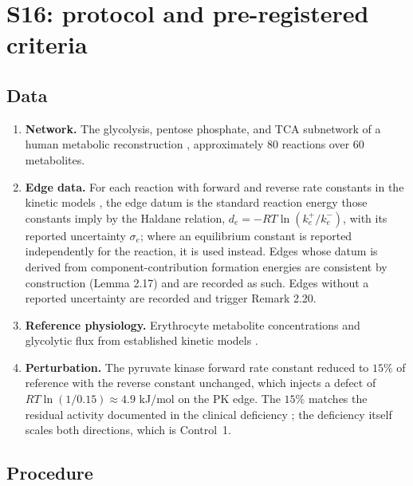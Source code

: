 \documentclass[11pt,a4paper]{article}
\theoremstyle{definition}
\theoremstyle{remark}
\begin{document}
\section*{S16: protocol and pre-registered criteria}

\subsection*{Data}

\begin{enumerate}[leftmargin=1.5em,itemsep=2pt]
\item \textbf{Network.} The glycolysis, pentose phosphate, and TCA
subnetwork of a human metabolic reconstruction
\citep{brunk2018}, approximately $80$ reactions over $60$ metabolites.
\item \textbf{Edge data.} For each reaction with forward and reverse rate
constants in the kinetic models \citep{rapoport1975,mulquiney1999}, the
edge datum is the standard reaction energy those constants imply by the
Haldane relation, $d_e=-RT\ln(k_e^{+}/k_e^{-})$, with its reported
uncertainty $\sigma_e$; where an equilibrium constant is reported
independently for the reaction, it is used instead. Edges whose datum is
derived from component-contribution formation energies
\citep{noor2013,flamholz2012} are consistent by construction
(Lemma 2.17) and are recorded as such. Edges without a
reported uncertainty are recorded and trigger Remark 2.20.
\item \textbf{Reference physiology.} Erythrocyte metabolite
concentrations and glycolytic flux from established kinetic models
\citep{rapoport1975,mulquiney1999}.
\item \textbf{Perturbation.} The pyruvate kinase forward rate constant
reduced to $15\%$ of reference with the reverse constant unchanged,
which injects a defect of $RT\ln(1/0.15)\approx4.9$ kJ/mol on the PK
edge. The $15\%$ matches the residual activity documented in the
clinical deficiency \citep{zanella2005}; the deficiency itself scales
both directions, which is Control~1.
\end{enumerate}

\subsection*{Procedure}
\end{document}
